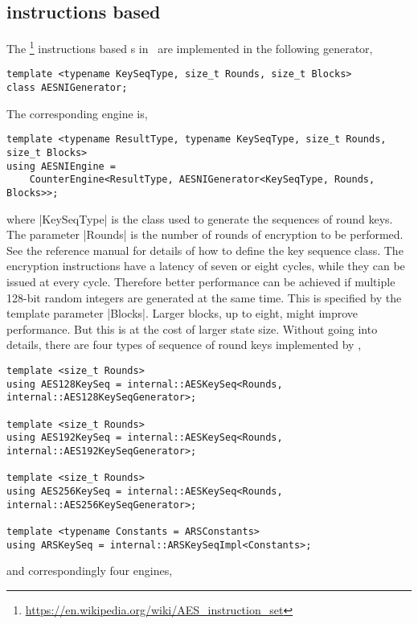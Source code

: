 \subsection{\texorpdfstring{\protect\aesni}{AES-NI} instructions based
  \texorpdfstring{\protect\rng}{RNG}}
\label{sub:AES-NI instructions based RNG}

The \aesni\footnote{\url{https://en.wikipedia.org/wiki/AES_instruction_set}}
instructions based \rng{}s in~\cite{Salmon:2011um} are implemented in the
following generator,
\begin{Verbatim}
template <typename KeySeqType, size_t Rounds, size_t Blocks>
class AESNIGenerator;
\end{Verbatim}
The corresponding \rng engine is,
\begin{Verbatim}
template <typename ResultType, typename KeySeqType, size_t Rounds, size_t Blocks>
using AESNIEngine =
    CounterEngine<ResultType, AESNIGenerator<KeySeqType, Rounds, Blocks>>;
\end{Verbatim}
where |KeySeqType| is the class used to generate the sequences of round keys.
The parameter |Rounds| is the number of rounds of \aes encryption to be
performed. See the reference manual for details of how to define the key
sequence class. The \aesni encryption instructions have a latency of seven or
eight cycles, while they can be issued at every cycle. Therefore better
performance can be achieved if multiple 128-bit random integers are generated
at the same time. This is specified by the template parameter |Blocks|. Larger
blocks, up to eight, might improve performance. But this is at the cost of
larger state size. Without going into details, there are four types of sequence
of round keys implemented by \mckl,
\begin{Verbatim}
template <size_t Rounds>
using AES128KeySeq = internal::AESKeySeq<Rounds, internal::AES128KeySeqGenerator>;

template <size_t Rounds>
using AES192KeySeq = internal::AESKeySeq<Rounds, internal::AES192KeySeqGenerator>;

template <size_t Rounds>
using AES256KeySeq = internal::AESKeySeq<Rounds, internal::AES256KeySeqGenerator>;

template <typename Constants = ARSConstants>
using ARSKeySeq = internal::ARSKeySeqImpl<Constants>;
\end{Verbatim}
and correspondingly four \rng engines,
